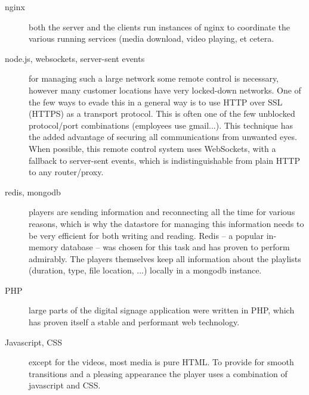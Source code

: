 \documentclass[]{friggeri-cv}
\begin{document}
\begin{entrylist}
{{\begin{description}
        \item[nginx] both the server and the clients run instances of nginx to coordinate the various running services (media download, video playing, et cetera.
        \item[node.js, websockets, server-sent events] for managing such a large network some remote control is necessary, however many customer locations have very locked-down networks. One of the few ways to evade this in a general way is to use HTTP over SSL (HTTPS) as a transport protocol. This is often one of the few unblocked protocol/port combinations (employees use gmail...). This technique has the added advantage of securing all communications from unwanted eyes. When possible, this remote control system uses WebSockets, with a fallback to server-sent events, which is indistinguishable from plain HTTP to any router/proxy.
        \item[redis, mongodb] players are sending information and reconnecting all the time for various reasons, which is why the datastore for managing this information needs to be very efficient for both writing and reading. Redis -- a popular in-memory database -- was chosen for this task and has proven to perform admirably. The players themselves keep all information about the playlists (duration, type, file location, ...) locally in a mongodb instance.
        \item[PHP] large parts of the digital signage application were written in PHP, which has proven itself a stable and performant web technology.
        \item[Javascript, CSS] except for the videos, most media is pure HTML. To provide for smooth transitions and a pleasing appearance the player uses a combination of javascript and CSS.
    \end{description}
    }}
\end{entrylist}
\end{document}
